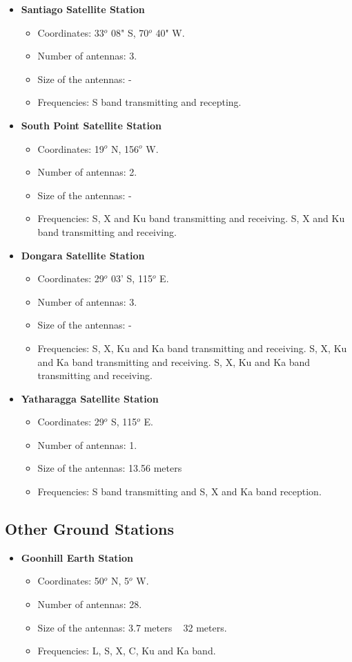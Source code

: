 \documentclass[12pt,a4paper]{report}
\begin{document}
\begin{itemize}
\item \textbf{Santiago Satellite Station}
\begin{itemize}
\item Coordinates: 33$^{o}$ 08" S, 70$^{o}$ 40" W.
\item Number of antennas: 3.
\item Size of the antennas: -
\item Frequencies: S band transmitting and recepting.
\end{itemize}
\item \textbf{South Point Satellite Station}
\begin{itemize}
\item Coordinates: 19$^{o}$ N, 156$^{o}$ W.
\item Number of antennas: 2.
\item Size of the antennas: -
\item Frequencies: S, X and Ku band transmitting and receiving. S, X and Ku band transmitting and receiving.
\end{itemize}
\item \textbf{Dongara Satellite Station}
\begin{itemize}
\item Coordinates: 29$^{o}$ 03' S, 115$^{o}$ E.
\item Number of antennas: 3.
\item Size of the antennas: -
\item Frequencies: S, X, Ku and Ka band transmitting and receiving. S, X, Ku and Ka band transmitting and receiving. S, X, Ku and Ka band transmitting and receiving.
\end{itemize}
\item \textbf{Yatharagga Satellite Station}
\begin{itemize}
\item Coordinates: 29$^{o}$ S, 115$^{o}$ E.
\item Number of antennas: 1.
\item Size of the antennas: 13.56 meters
\item Frequencies: S band transmitting and S, X and Ka band reception.
\end{itemize}
\end{itemize}

\subsection{Other Ground Stations}
\begin{itemize}
\item \textbf{Goonhill Earth Station}
\begin{itemize}
\item Coordinates: 50$^{o}$ N, 5$^{o}$ W.
\item Number of antennas: 28.
\item Size of the antennas: 3.7 meters ~ 32 meters.
\item Frequencies: L, S, X, C, Ku and Ka band.
\end{itemize}
\end{itemize}
\end{document}
